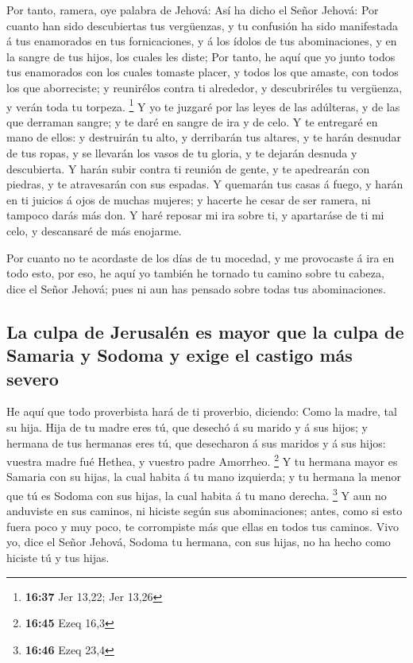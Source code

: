  Por tanto, ramera, oye palabra de Jehová: 
Así ha dicho el Señor Jehová: Por cuanto han sido descubiertas tus
vergüenzas, y tu confusión ha sido manifestada á tus enamorados en tus
fornicaciones, y á los ídolos de tus abominaciones, y en la sangre de
tus hijos, los cuales les diste;  Por tanto, he aquí que yo
junto todos tus enamorados con los cuales tomaste placer, y todos los
que amaste, con todos los que aborreciste; y reunirélos contra ti
alrededor, y descubriréles tu vergüenza, y verán toda tu torpeza.
\footnote{\textbf{16:37} Jer 13,22; Jer 13,26}  Y yo te
juzgaré por las leyes de las adúlteras, y de las que derraman sangre; y
te daré en sangre de ira y de celo.  Y te entregaré en mano
de ellos: y destruirán tu alto, y derribarán tus altares, y te harán
desnudar de tus ropas, y se llevarán los vasos de tu gloria, y te
dejarán desnuda y descubierta.  Y harán subir contra ti
reunión de gente, y te apedrearán con piedras, y te atravesarán con sus
espadas.  Y quemarán tus casas á fuego, y harán en ti
juicios á ojos de muchas mujeres; y hacerte he cesar de ser ramera, ni
tampoco darás más don.  Y haré reposar mi ira sobre ti, y
apartaráse de ti mi celo, y descansaré de más enojarme.

 Por cuanto no te acordaste de los días de tu mocedad, y me
provocaste á ira en todo esto, por eso, he aquí yo también he tornado tu
camino sobre tu cabeza, dice el Señor Jehová; pues ni aun has pensado
sobre todas tus abominaciones.

\hypertarget{la-culpa-de-jerusaluxe9n-es-mayor-que-la-culpa-de-samaria-y-sodoma-y-exige-el-castigo-muxe1s-severo}{%
\subsection{La culpa de Jerusalén es mayor que la culpa de Samaria y
Sodoma y exige el castigo más
severo}\label{la-culpa-de-jerusaluxe9n-es-mayor-que-la-culpa-de-samaria-y-sodoma-y-exige-el-castigo-muxe1s-severo}}

 He aquí que todo proverbista hará de ti proverbio,
diciendo: Como la madre, tal su hija.  Hija de tu madre
eres tú, que desechó á su marido y á sus hijos; y hermana de tus
hermanas eres tú, que desecharon á sus maridos y á sus hijos: vuestra
madre fué Hethea, y vuestro padre Amorrheo. \footnote{\textbf{16:45}
  Ezeq 16,3}  Y tu hermana mayor es Samaria con su hijas,
la cual habita á tu mano izquierda; y tu hermana la menor que tú es
Sodoma con sus hijas, la cual habita á tu mano derecha. \footnote{\textbf{16:46}
  Ezeq 23,4}  Y aun no anduviste en sus caminos, ni hiciste
según sus abominaciones; antes, como si esto fuera poco y muy poco, te
corrompiste más que ellas en todos tus caminos.  Vivo yo,
dice el Señor Jehová, Sodoma tu hermana, con sus hijas, no ha hecho como
hiciste tú y tus hijas.

